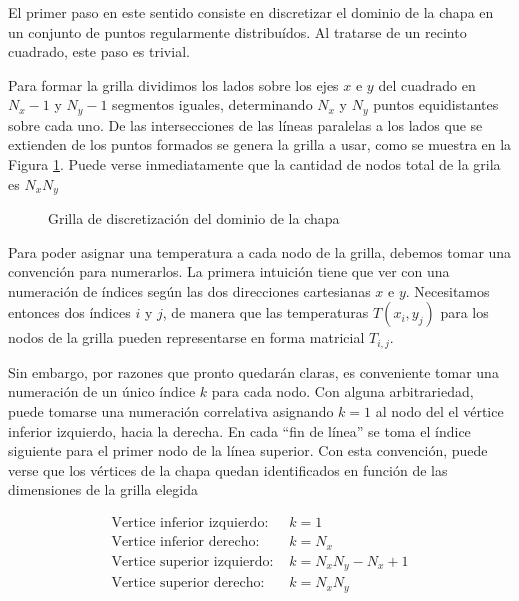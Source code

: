 
El primer paso en este sentido consiste en discretizar 
el dominio de la chapa en un conjunto de puntos regularmente 
distribuídos. Al tratarse de un recinto cuadrado, este paso es trivial.

Para formar la grilla dividimos los lados sobre 
los ejes $x$ e $y$ del cuadrado en $N_x-1$ y $N_y-1$
segmentos iguales, determinando $N_x$ y $N_y$ puntos
equidistantes sobre cada uno. De las intersecciones
de las líneas paralelas a los lados que se 
extienden de los puntos formados se genera la grilla 
a usar, como se muestra en la Figura \ref{FiguraDiscretizacion}.
Puede verse inmediatamente que la cantidad de nodos
total de la grila es $N_x N_y$

\begin{figure}
  \caption{Grilla de discretización del dominio de la chapa\label{FiguraDiscretizacion}}
\end{figure}

Para poder asignar una temperatura a cada nodo de la grilla, 
debemos tomar una convención para numerarlos. La primera
intuición tiene que ver con una numeración de índices según 
las dos direcciones cartesianas $x$ e $y$. Necesitamos 
entonces dos índices $i$ y $j$, de manera que las 
temperaturas $T(x_i,y_j)$ para los nodos de la grilla
pueden representarse en forma matricial $T_{i,j}$.

Sin embargo, por razones que pronto quedarán claras, es 
conveniente tomar una numeración de un único índice $k$
para cada nodo.  
Con alguna arbitrariedad, puede tomarse una numeración
correlativa asignando $k=1$ al nodo del 
el vértice inferior izquierdo, hacia la 
derecha. En cada ``fin de línea'' se toma el índice 
siguiente para el primer nodo de la línea superior. 
Con esta convención, puede verse que los vértices 
de la chapa quedan identificados en función de las dimensiones
de la grilla elegida

\begin{equation}
  \begin{split}
    \text{Vertice inferior izquierdo:   } & k=1\\
    \text{Vertice inferior derecho:     } & k=N_x \\
    \text{Vertice superior izquierdo:   } & k=N_xN_y-N_x+1\\
    \text{Vertice superior derecho:     } & k=N_xN_y
  \end{split}
  \label{EqEcuacionesNumeracionVerticies}
\end{equation}

